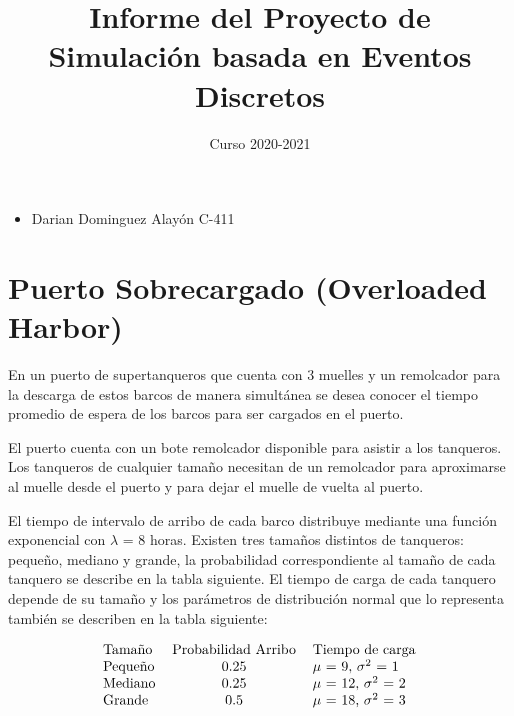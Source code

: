 \documentclass[a4paper,10pt]{article}
\title{Informe del Proyecto de Simulación basada en Eventos Discretos }
\date{Curso 2020-2021}
\begin{document}
\maketitle
{}

  \begin{itemize}
      \item Darian Dominguez Alayón C-411
    \end{itemize}


\section*{Puerto Sobrecargado (Overloaded Harbor)}\label{sec:intro}
  En un puerto de supertanqueros que cuenta con 3 muelles y un remolcador para la descarga de estos barcos de manera 
  simultánea se desea conocer el tiempo promedio de espera de los barcos para ser cargados en el puerto. 

  El puerto cuenta con un bote remolcador disponible para asistir a los tanqueros. Los tanqueros de cualquier tamaño necesitan 
  de un remolcador para aproximarse al muelle desde el puerto y para dejar el muelle de vuelta al puerto. 

  El tiempo de intervalo de arribo de cada barco distribuye mediante una función exponencial con $\lambda$ = 8 horas. 
  Existen tres tamaños distintos de tanqueros: pequeño, mediano y grande, la probabilidad correspondiente al tamaño de 
  cada tanquero se describe en la tabla siguiente. El tiempo de carga de cada tanquero depende de su tamaño y los 
  parámetros de distribución normal que lo representa también se describen en la tabla siguiente:

\begin{displaymath}
   \begin{tabular}{l c l}
    Tamaño & Probabilidad Arribo & Tiempo de carga \\
    Pequeño & 0.25 & $\mu$ = 9,  $\sigma^2$ = 1 \\
    Mediano & 0.25 & $\mu$ = 12, $\sigma^2$ = 2\\
    Grande  & 0.5  & $\mu$ = 18, $\sigma^2$ = 3 \\
  \end{tabular}
\end{displaymath}
\end{document}

